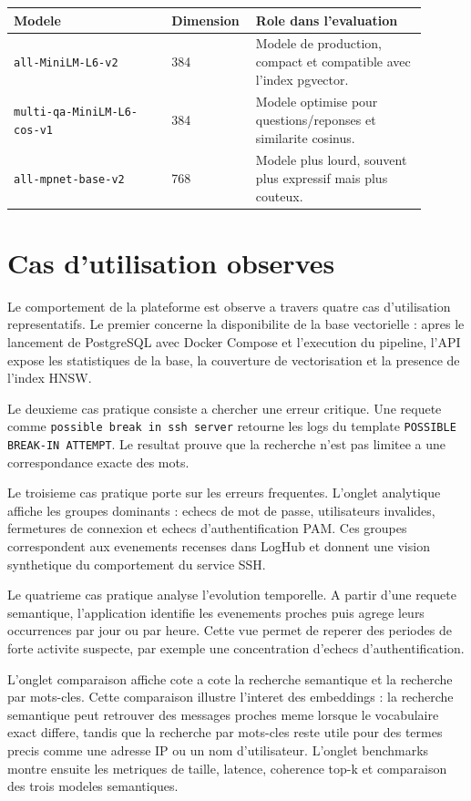 \documentclass[12pt,a4paper]{article}
\begin{document}
\begin{longtable}{p{0.36\linewidth}p{0.15\linewidth}p{0.39\linewidth}}
\toprule
Modele & Dimension & Role dans l'evaluation\\
\midrule
\texttt{all-MiniLM-L6-v2} & 384 & Modele de production, compact et compatible avec l'index pgvector.\\
\texttt{multi-qa-MiniLM-L6-cos-v1} & 384 & Modele optimise pour questions/reponses et similarite cosinus.\\
\texttt{all-mpnet-base-v2} & 768 & Modele plus lourd, souvent plus expressif mais plus couteux.\\
\bottomrule
\end{longtable}

\section{Cas d'utilisation observes}

Le comportement de la plateforme est observe a travers quatre cas d'utilisation representatifs.
Le premier concerne la disponibilite de la base vectorielle : apres le lancement de PostgreSQL avec
Docker Compose et l'execution du pipeline, l'API expose les statistiques de la base, la couverture
de vectorisation et la presence de l'index HNSW.

Le deuxieme cas pratique consiste a chercher une erreur critique. Une requete comme
\texttt{possible break in ssh server} retourne les logs du template
\texttt{POSSIBLE BREAK-IN ATTEMPT}. Le resultat prouve que la recherche n'est pas limitee a une
correspondance exacte des mots.

Le troisieme cas pratique porte sur les erreurs frequentes. L'onglet analytique affiche les groupes
dominants : echecs de mot de passe, utilisateurs invalides, fermetures de connexion et echecs
d'authentification PAM. Ces groupes correspondent aux evenements recenses dans LogHub et donnent une
vision synthetique du comportement du service SSH.

Le quatrieme cas pratique analyse l'evolution temporelle. A partir d'une requete semantique,
l'application identifie les evenements proches puis agrege leurs occurrences par jour ou par heure.
Cette vue permet de reperer des periodes de forte activite suspecte, par exemple une concentration
d'echecs d'authentification.

L'onglet comparaison affiche cote a cote la recherche semantique et la recherche par
mots-cles. Cette comparaison illustre l'interet des embeddings : la recherche semantique peut
retrouver des messages proches meme lorsque le vocabulaire exact differe, tandis que la recherche
par mots-cles reste utile pour des termes precis comme une adresse IP ou un nom d'utilisateur.
L'onglet benchmarks montre ensuite les metriques de taille, latence, coherence top-k et comparaison
des trois modeles semantiques.
\end{document}
